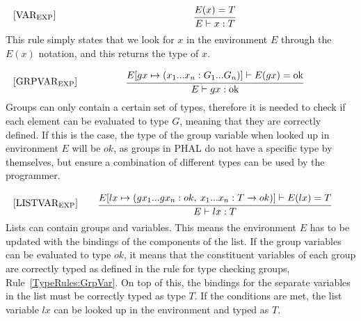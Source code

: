 \begin{equation}
\begin{minipage}{.2\linewidth}
$[\text{VAR}_\text{EXP}]$
\end{minipage}
\begin{minipage}{.8\linewidth}
\centering
$\cfrac{E(x) = T} {E \vdash x : T}$
\end{minipage}
\end{equation}
This rule simply states that we look for $x$ in the environment $E$ through the $E(x)$ notation, and this returns the type of $x$.

\begin{equation}\label{TypeRules:GrpVar}
\begin{minipage}{.2\linewidth}
$[\text{GRPVAR}_\text{EXP}]$
\end{minipage}
\begin{minipage}{.8\linewidth}
\centering
$\cfrac{E[gx \mapsto (x_1...x_n : G_1...G_n)] \vdash E(gx) = \text{ok} } {E \vdash gx : \text{ok}}$
\end{minipage}
\end{equation}
Groups can only contain a certain set of types, therefore it is needed to check if each element can be evaluated to type $G$, meaning that they are correctly defined. If this is the case, the type of the group variable when looked up in environment $E$ will be $ok$, as groups in PHAL do not have a specific type by themselves, but ensure a combination of different types can be used by the programmer.


\begin{equation}
\begin{minipage}{.2\linewidth}
$[\text{LISTVAR}_\text{EXP}]$
\end{minipage}
\begin{minipage}{.8\linewidth}
\centering
$\cfrac{E[lx \mapsto (gx_1...gx_n : ok,\: x_1...x_n : T \xrightarrow{} ok)] \vdash E(lx) = T } {E \vdash lx : T}$
\end{minipage}
\end{equation}
Lists can contain groups and variables. This means the environment $E$ has to be updated with the bindings of the components of the list. If the group variables can be evaluated to type $ok$, it means that the constituent variables of each group are correctly typed as defined in the rule for type checking groups, Rule~\ref{TypeRules:GrpVar}. On top of this, the bindings for the separate variables in the list must be correctly typed as type $T$. If the conditions are met, the list variable $lx$ can be looked up in the environment and typed as $T$. 

